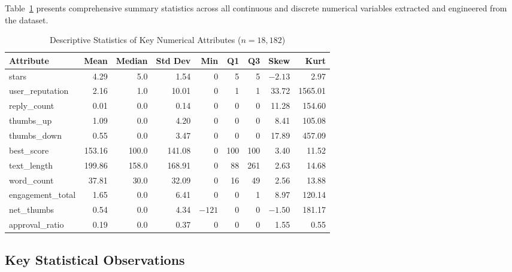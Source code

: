 \documentclass[12pt,a4paper]{article}
\begin{document}
Table~\ref{tab:desc_stats} presents comprehensive summary statistics across all continuous and discrete numerical variables extracted and engineered from the dataset.

\begin{table}[H]
\centering
\caption{Descriptive Statistics of Key Numerical Attributes ($n = 18{,}182$)}
\label{tab:desc_stats}
\small
\begin{tabular}{l r r r r r r r r}
\toprule
\textbf{Attribute} & \textbf{Mean} & \textbf{Median} & \textbf{Std Dev} & \textbf{Min} & \textbf{Q1} & \textbf{Q3} & \textbf{Skew} & \textbf{Kurt} \\
\midrule
stars            & 4.29  & 5.0   & 1.54   & 0   & 5    & 5    & $-2.13$ & 2.97 \\
user\_reputation & 2.16  & 1.0   & 10.01  & 0   & 1    & 1    & 33.72   & 1565.01 \\
reply\_count     & 0.01  & 0.0   & 0.14   & 0   & 0    & 0    & 11.28   & 154.60 \\
thumbs\_up       & 1.09  & 0.0   & 4.20   & 0   & 0    & 0    & 8.41    & 105.08 \\
thumbs\_down     & 0.55  & 0.0   & 3.47   & 0   & 0    & 0    & 17.89   & 457.09 \\
best\_score      & 153.16& 100.0 & 141.08 & 0   & 100  & 100  & 3.40    & 11.52 \\
text\_length     & 199.86& 158.0 & 168.91 & 0   & 88   & 261  & 2.63    & 14.68 \\
word\_count      & 37.81 & 30.0  & 32.09  & 0   & 16   & 49   & 2.56    & 13.88 \\
engagement\_total& 1.65  & 0.0   & 6.41   & 0   & 0    & 1    & 8.97    & 120.14 \\
net\_thumbs      & 0.54  & 0.0   & 4.34   & $-121$& 0  & 0    & $-1.50$ & 181.17 \\
approval\_ratio  & 0.19  & 0.0   & 0.37   & 0   & 0    & 0    & 1.55    & 0.55 \\
\bottomrule
\end{tabular}
\end{table}

\subsection{Key Statistical Observations}
\end{document}
